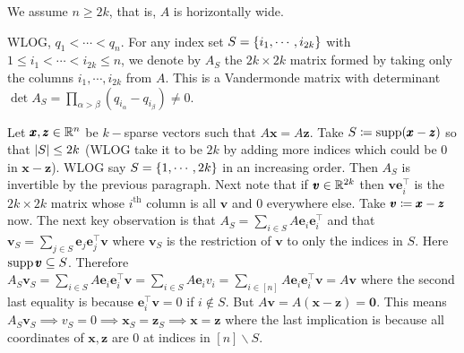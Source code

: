 \soln

We assume $n \ge 2k$, that is, $A$ is horizontally wide.

WLOG, $q_{1}< \cdots < q_{n}$. For any index set $S=\left\{i_{1},\cdots,i_{2k}\right\}$ with $1\le i_{1}<\cdots<i_{2k}\le n$, we denote by $A_{S}$ the $2k\times 2k$ matrix formed by taking only the columns $i_{1},\cdots,i_{2k}$ from $A$. This is a Vandermonde matrix with determinant $\det A_{S} = \prod_{\alpha>\beta}(q_{i_{\alpha}}-q_{i_{\beta}}) \ne 0$. %

Let $\pmb x,\pmb z\in\mathbb{R}^{n}$ be $k-$sparse vectors such that $A\pmb x = A\pmb z$. Take $S\coloneqq \operatorname{supp} (\pmb x-\pmb z)$ so that $\left| S \right| \le 2k$ (WLOG take it to be $2k$ by adding more indices which could be $0$ in $\pmb x-\pmb z$). WLOG say $S=\left\{{1},\cdots,{2k}\right\}$ in an increasing order. Then $A_{S}$ is invertible by the previous paragraph. Next note that if $\pmb v\in\mathbb{R}^{2k}$ then $\pmb v \pmb e_{i}^{\top}$ is the $2k\times 2k$ matrix whose $i^{\text{th}}$ column is all $\pmb v$ and $0$ everywhere else. Take $\pmb v\coloneqq \pmb x-\pmb z$ now. The next key observation is that $A_{S} = \sum_{i\in S} A\pmb e_{i} \pmb e_{i}^{\top}$ and that $\pmb v_{S} =  \sum_{j\in S}\pmb e_{j}\pmb e_{j}^{\top}\pmb v$ where $\pmb v_{S}$ is the restriction of $\pmb v$ to only the indices in $S$. Here $\operatorname{supp} \pmb v\subseteq S$. Therefore $A_{S}\pmb v_{S} = \sum_{i\in S}A \pmb e_{i} \pmb e_{i}^{\top}\pmb v = \sum_{i\in S}A \pmb e_{i} v_{i} = \sum_{i\in [n]}A \pmb e_{i} \pmb e_{i}^{\top}\pmb v = A\pmb v$ where the second last equality is because $\pmb e_{i}^{\top}\pmb v=0$ if $i\notin S$. But $A\pmb v = A(\pmb x-\pmb z) = \pmb0$. This means $A_{S}\pmb v_{S}\implies v_{S} = 0 \implies \pmb x_{S} = \pmb z_{S} \implies \pmb x = \pmb z$ where the last implication is because all coordinates of $\pmb x,\pmb z$ are $0$ at indices in $[n]\smallsetminus S$.





\newpage
\pb

